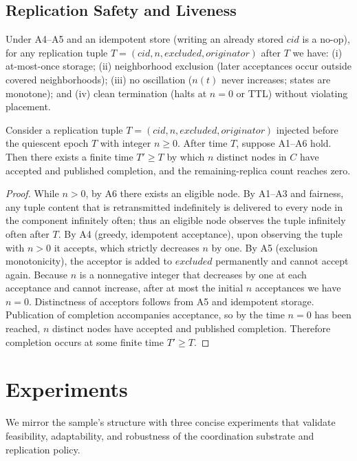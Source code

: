 \documentclass[runningheads]{llncs}
\begin{document}
\subsection{Replication Safety and Liveness}
\begin{proposition}
Under A4–A5 and an idempotent store (writing an already stored $\mathit{cid}$ is a no-op), for any replication tuple $T=(\mathit{cid},n,\mathit{excluded},\mathit{originator})$ after $T$ we have: (i) at-most-once storage; (ii) neighborhood exclusion (later acceptances occur outside covered neighborhoods); (iii) no oscillation ($n(t)$ never increases; states are monotone); and (iv) clean termination (halts at $n{=}0$ or TTL) without violating placement.
\end{proposition}

\begin{theorem}\label{thm:repl-liveness}
Consider a replication tuple $T=(\mathit{cid},n,\mathit{excluded},\mathit{originator})$ injected before the quiescent epoch $T$ with integer $n\ge 0$. After time $T$, suppose A1–A6 hold. Then there exists a finite time $T'\ge T$ by which $n$ distinct nodes in $C$ have accepted and published completion, and the remaining-replica count reaches zero.
\end{theorem}
\begin{proof}
While $n>0$, by A6 there exists an eligible node. By A1–A3 and fairness, any tuple content that is retransmitted indefinitely is delivered to every node in the component infinitely often; thus an eligible node observes the tuple infinitely often after $T$. By A4 (greedy, idempotent acceptance), upon observing the tuple with $n>0$ it accepts, which strictly decreases $n$ by one. By A5 (exclusion monotonicity), the acceptor is added to $\mathit{excluded}$ permanently and cannot accept again. Because $n$ is a nonnegative integer that decreases by one at each acceptance and cannot increase, after at most the initial $n$ acceptances we have $n=0$. Distinctness of acceptors follows from A5 and idempotent storage. Publication of completion accompanies acceptance, so by the time $n=0$ has been reached, $n$ distinct nodes have accepted and published completion. Therefore completion occurs at some finite time $T'\ge T$.
\end{proof}

\section{Experiments}
We mirror the sample’s structure with three concise experiments that validate feasibility, adaptability, and robustness of the coordination substrate and replication policy.
\end{document}
